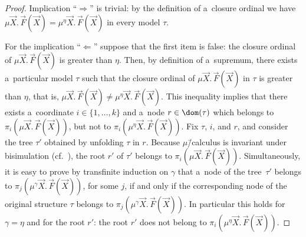 \begin{proof}
	Implication ``$\Rightarrow$'' is trivial: by the definition of a~closure ordinal we have $\mu\vec{X}.\,\vec{F}(\vec{X})=\mu^\eta\vec{X}.\,\vec{F}(\vec{X})$ in every model $\tau$.
	
	For the implication ``$\Leftarrow$'' suppose that the first item is false: the closure ordinal of $\mu\vec{X}.\,\vec{F}(\vec{X})$ is greater than $\eta$.
	Then, by definition of a~supremum, there exists a~particular model $\tau$ such that the closure ordinal of $\mu\vec{X}.\,\vec{F}(\vec{X})$ in $\tau$ is greater than $\eta$,
	that is, $\mu\vec{X}.\,\vec{F}(\vec{X})\neq\mu^\eta\vec{X}.\,\vec{F}(\vec{X})$.
	This inequality implies that there exists a~coordinate $i\in\{1,\dots,k\}$ and a~node $r\in\dom(\tau)$ which belongs to $\pi_i(\mu\vec{X}.\,\vec{F}(\vec{X}))$, but not to $\pi_i(\mu^\eta\vec{X}.\,\vec{F}(\vec{X}))$.
	Fix $\tau$, $i$, and $r$, and consider the tree $\tau'$ obtained by unfolding $\tau$ in $r$.
	Because $\mu$\=/calculus is invariant under bisimulation
	(cf.~\cite[Section~26.3.1]{julian-igor-handook}), the root $r'$ of $\tau'$ belongs to $\pi_i(\mu\vec{X}.\,\vec{F}(\vec{X}))$.
	Simultaneously, it is easy to prove by transfinite induction on $\gamma$ that a~node of the tree~$\tau'$ belongs to $\pi_j(\mu^\gamma\vec{X}.\,\vec{F}(\vec{X}))$, for some $j$,
	if and only if the corresponding node of the original structure $\tau$ belongs to $\pi_j(\mu^\gamma\vec{X}.\,\vec{F}(\vec{X}))$.
	In particular this holds for $\gamma=\eta$ and for the root $r'$: the root $r'$ does not belong to $\pi_i(\mu^\eta\vec{X}.\,\vec{F}(\vec{X}))$.
	

\end{proof}
